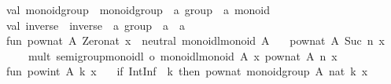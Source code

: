 \begin{isabellebody}
\begin{isamarkuptext}
val\ monoid{}group\ {}\ {}monoid{}group\ {}\ {}a\ group\ {}{}\ {}a\ monoid{}\isanewline
val\ inverse\ {}\ {}inverse\ {}\ {}a\ group\ {}{}\ {}a\ {}{}\ {}a{}\isanewline
\isanewline
fun\ pow{}nat\ A{}\ Zero{}nat\ x\ {}\ neutral\ {}monoidl{}monoid\ A{}{}\isanewline
\ \ {}\ pow{}nat\ A{}\ {}Suc\ n{}\ x\ {}\isanewline
\ \ \ \ mult\ {}{}semigroup{}monoidl\ o\ monoidl{}monoid{}\ A{}{}\ x\ {}pow{}nat\ A{}\ n\ x{}{}\isanewline
\isanewline
fun\ pow{}int\ A{}\ k\ x\ {}\isanewline
\ \ {}if\ IntInf{}{}{}\ {}{}{}\ k{}\ then\ pow{}nat\ {}monoid{}group\ A{}{}\ {}nat\ k{}\ x\isanewline

\end{isamarkuptext}
\end{isabellebody}

